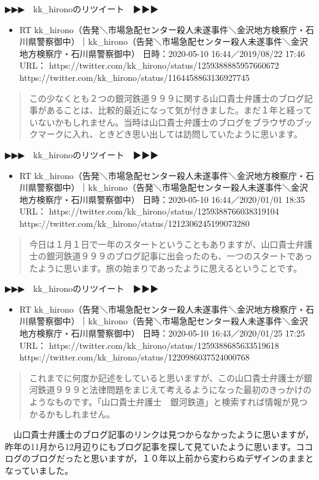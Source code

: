 \documentclass[]{ltjarticle}
\providecommand{\tightlist}{%
  \setlength{\itemsep}{0pt}\setlength{\parskip}{0pt}}
\begin{document}
▶▶▶　kk\_hironoのリツイート　▶▶▶

\begin{itemize}
\tightlist
\item
  RT
  kk\_hirono（告発＼市場急配センター殺人未遂事件＼金沢地方検察庁・石川県警察御中）｜kk\_hirono（告発＼市場急配センター殺人未遂事件＼金沢地方検察庁・石川県警察御中）
  日時：2020-05-10 16:44／2019/08/22 17:46 URL：
  https://twitter.com/kk\_hirono/status/1259388885957660672
  https://twitter.com/kk\_hirono/status/1164458863136927745
\end{itemize}

\begin{quote}
この少なくとも２つの銀河鉄道９９９に関する山口貴士弁護士のブログ記事があることは、比較的最近になって気が付きました。まだ１年と経っていないかもしれません。当時は山口貴士弁護士のブログをブラウザのブックマークに入れ、ときどき思い出しては訪問していたように思います。
\end{quote}

▶▶▶　kk\_hironoのリツイート　▶▶▶

\begin{itemize}
\tightlist
\item
  RT
  kk\_hirono（告発＼市場急配センター殺人未遂事件＼金沢地方検察庁・石川県警察御中）｜kk\_hirono（告発＼市場急配センター殺人未遂事件＼金沢地方検察庁・石川県警察御中）
  日時：2020-05-10 16:44／2020/01/01 18:35 URL：
  https://twitter.com/kk\_hirono/status/1259388766038319104
  https://twitter.com/kk\_hirono/status/1212306245199073280
\end{itemize}

\begin{quote}
今日は１月１日で一年のスタートということもありますが、山口貴士弁護士の銀河鉄道９９９のブログ記事に出会ったのも、一つのスタートであったように思います。旅の始まりであったように思えるということです。
\end{quote}

▶▶▶　kk\_hironoのリツイート　▶▶▶

\begin{itemize}
\tightlist
\item
  RT
  kk\_hirono（告発＼市場急配センター殺人未遂事件＼金沢地方検察庁・石川県警察御中）｜kk\_hirono（告発＼市場急配センター殺人未遂事件＼金沢地方検察庁・石川県警察御中）
  日時：2020-05-10 16:43／2020/01/25 17:25 URL：
  https://twitter.com/kk\_hirono/status/1259388685633519618
  https://twitter.com/kk\_hirono/status/1220986037524000768
\end{itemize}

\begin{quote}
これまでに何度か記述をしていると思いますが、この山口貴士弁護士が銀河鉄道９９９と法律問題をまじえて考えるようになった最初のきっかけのようなものです。「山口貴士弁護士　銀河鉄道」と検索すれば情報が見つかるかもしれません。
\end{quote}

　山口貴士弁護士のブログ記事のリンクは見つからなかったように思いますが，昨年の11月から12月辺りにもブログ記事を探して見ていたように思います。ココログのブログだったと思いますが，１０年以上前から変わらぬデザインのままとなっていました。
\end{document}
